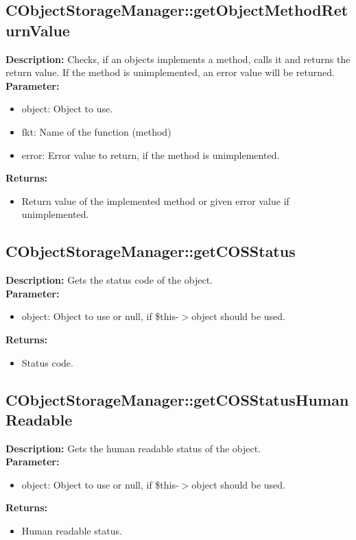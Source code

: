 \subsection{CObjectStorageManager::getObjectMethodReturnValue}
\textbf{Description:} Checks, if an objects implements a method, calls it and returns the return value. If the method is unimplemented, an error value will be returned.\\
\textbf{Parameter:}
\begin{itemize}
\item object: Object to use.
\item fkt: Name of the function (method)
\item error: Error value to return, if the method is unimplemented.
\end{itemize}
\textbf{Returns:}
\begin{itemize}
\item Return value of the implemented method or given error value if unimplemented.
\end{itemize}

\subsection{CObjectStorageManager::getCOSStatus}
\textbf{Description:} Gets the status code of the object.\\
\textbf{Parameter:}
\begin{itemize}
\item object: Object to use or null, if \$this-$>$object should be used.
\end{itemize}
\textbf{Returns:}
\begin{itemize}
\item Status code.
\end{itemize}

\subsection{CObjectStorageManager::getCOSStatusHumanReadable}
\textbf{Description:} Gets the human readable status of the object.\\
\textbf{Parameter:}
\begin{itemize}
\item object: Object to use or null, if \$this-$>$object should be used.
\end{itemize}
\textbf{Returns:}
\begin{itemize}
\item Human readable status.
\end{itemize}

